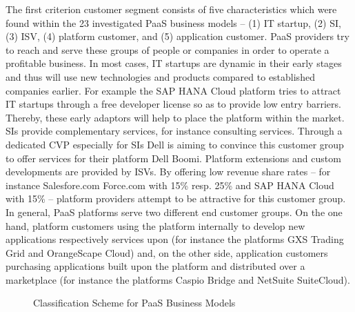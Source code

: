 The first criterion customer segment consists of five characteristics which were found within the 23 investigated \ac{PaaS} business models --  (1) \ac{IT} startup, (2) \ac{SI}, (3) \ac{ISV}, (4) platform customer, and (5) application customer. \ac{PaaS} providers try to reach and serve these groups of people or companies in order to operate a profitable business. In most cases, \ac{IT} startups are dynamic in their early stages and thus will use new technologies and products compared to established companies earlier. For example the SAP HANA Cloud platform tries to attract \ac{IT} startups through a free developer license so as to provide low entry barriers. Thereby, these early adaptors will help to place the platform within the market. \acp{SI} provide complementary services, for instance consulting services. Through a dedicated \ac{CVP} especially for \acp{SI} Dell is aiming to convince this customer group to offer services for their platform Dell Boomi. Platform extensions and custom developments are provided by \acp{ISV}. By offering low revenue share rates -- for instance Salesfore.com Force.com with 15\% resp. 25\% and SAP HANA Cloud with 15\% -- platform providers attempt to be attractive for this customer group. In general, \ac{PaaS} platforms serve two different end customer groups. On the one hand, platform customers using the platform internally to develop new applications respectively services upon (for instance the platforms GXS Trading Grid and OrangeScape Cloud) and, on the other side, application customers purchasing applications built upon the platform and distributed over a marketplace (for instance the platforms Caspio Bridge and NetSuite SuiteCloud).

\begin{figure}[tb]
	\centering
	
	\caption{Classification Scheme for PaaS Business Models}
	\label{fig:cs}
\end{figure}

